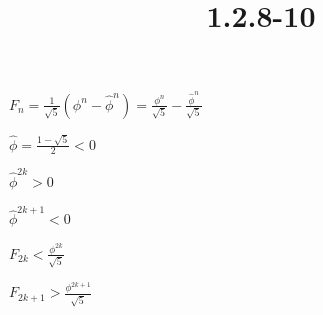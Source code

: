\documentclass{article}
\title{1.2.8-10}
\begin{document}
\maketitle

\( F_{n} = \frac{1}{\sqrt{5}}(\phi^n - \widehat{\phi}^n) = \frac{\phi^n}{\sqrt{5}} - \frac{\widehat{\phi}^n}{\sqrt{5}} \)

\( \widehat{\phi} = \frac{1-\sqrt{5}}{2} < 0 \)

\( \widehat{\phi}^{2k} > 0 \)

\( \widehat{\phi}^{2k+1} < 0 \)

\( F_{2k} < \frac{\phi^{2k}}{\sqrt{5}} \)

\( F_{2k+1} > \frac{\phi^{2k+1}}{\sqrt{5}} \)
\end{document}
